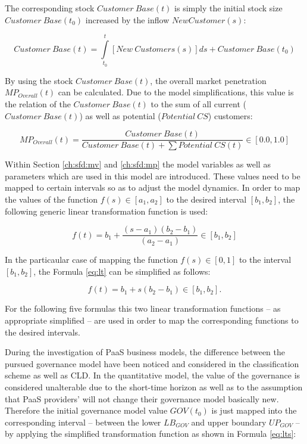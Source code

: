 The corresponding stock $Customer~Base(t)$ is simply the initial stock size $\mathit{Customer~Base(t_0)}$ increased by the inflow $New Customer(s)$:

\begin{equation}\label{eq:cb}
	\mathit{Customer~Base(t)} = \int\limits_{t_0}^t \mathit{[New~Customers(s)]ds} + \mathit{Customer~Base(t_0)}
\end{equation}

By using the stock $Customer~Base(t)$, the overall market penetration $MP_{Overall}(t)$ can be calculated. Due to the model simplifications, this value is the relation of the $Customer~Base(t)$ to the sum of all current ($Customer~Base(t)$) as well as potential ($Potential~CS$) customers:

\begin{equation}\label{eq:mpo}
	MP_{Overall}(t) = \frac{\mathit{Customer~Base(t)}}{\mathit{Customer~Base(t)} + \sum \mathit{Potential~CS(t)}} \in [0.0,1.0]
\end{equation}

Within Section \ref{ch:sfd:mv} and \ref{ch:sfd:mp} the model variables as well as parameters which are used in this model are introduced. These values need to be mapped to certain intervals so as to adjust the model dynamics. In order to map the values of the function $f(s) \in [a_1,a_2]$ to the desired interval $[b_1,b_2]$, the following generic linear transformation function is used:

\begin{equation}\label{eq:lt}
	f(t) = b_{1} + \frac{(s-a_1)(b_2-b_1)}{(a_2-a_1)} \in [b_1,b_2]
\end{equation}

In the particaular case of mapping the function $f(s) \in [0,1]$ to the interval $[b_1,b_2]$, the Formula \ref{eq:lt} can be simplified as follows:

\begin{equation}\label{eq:lts}
	f(t) = b_{1} + s (b_{2}-b_{1}) \in [b_{1},b_{2}].
\end{equation}

For the following five formulas this two linear transformation functions -- as appropriate simplified -- are used in order to map the corresponding functions to the desired intervals.

During the investigation of \ac{PaaS} business models, the difference between the pursued governance model have been noticed and considered in the classification scheme as well as \ac{CLD}. In the quantitative model, the value of the governance is considered unalterable due to the short-time horizon as well as to the assumption that \ac{PaaS} providers' will not change their governance model basically new. Therefore the initial governance model value $GOV(t_0)$ is just mapped into the corresponding interval -- between the lower $LB_{GOV}$ and upper boundary $UP_{GOV}$ -- by applying the simplified transformation function as shown in Formula \ref{eq:lts}:

